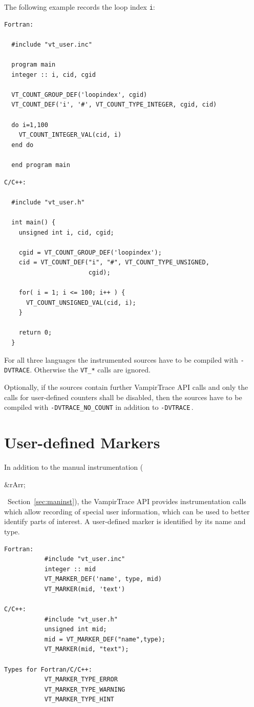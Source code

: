 \documentclass[a4paper,twoside,12pt,BCOR12mm]{scrbook}
\newcommand{\rarr}{$\Rightarrow$}  %
\renewcommand{\rarr}{\begin{rawhtml}&rArr;\end{rawhtml}}   %
\begin{document}
\noindent The following example records the loop index \texttt{i}:

\begin{verbatim}
Fortran:

  #include "vt_user.inc"

  program main
  integer :: i, cid, cgid

  VT_COUNT_GROUP_DEF('loopindex', cgid)
  VT_COUNT_DEF('i', '#', VT_COUNT_TYPE_INTEGER, cgid, cid)

  do i=1,100
    VT_COUNT_INTEGER_VAL(cid, i)
  end do

  end program main
\end{verbatim} 

\begin{verbatim}
C/C++:

  #include "vt_user.h"

  int main() {
    unsigned int i, cid, cgid;

    cgid = VT_COUNT_GROUP_DEF('loopindex');
    cid = VT_COUNT_DEF("i", "#", VT_COUNT_TYPE_UNSIGNED,
                       cgid);

    for( i = 1; i <= 100; i++ ) {
      VT_COUNT_UNSIGNED_VAL(cid, i);
    }

    return 0;
  }
\end{verbatim}

  \noindent For all three languages the instrumented sources have to be compiled 
  with \texttt{-DVTRACE}. Otherwise the \texttt{VT\_*} calls are ignored.

  Optionally, if the sources contain further VampirTrace API calls and only the
  calls for user-defined counters shall be disabled, then the sources have to be
  compiled with \texttt{-DVTRACE\_NO\_COUNT} in addition to \texttt{-DVTRACE}\,.

\section{User-defined Markers}
\label{userdefinedmarkers}

  In addition to the manual instrumentation (\rarr\ Section~\ref{sec:maninst}), the VampirTrace API
  provides instrumentation calls which allow recording of special user information, which 
  can be used to better identify parts of interest.
  A user-defined marker is identified by its name and type.

\begin{verbatim}
Fortran:
           #include "vt_user.inc"
           integer :: mid
           VT_MARKER_DEF('name', type, mid)
           VT_MARKER(mid, 'text')

C/C++:
           #include "vt_user.h"
           unsigned int mid;
           mid = VT_MARKER_DEF("name",type);
           VT_MARKER(mid, "text");

Types for Fortran/C/C++:
           VT_MARKER_TYPE_ERROR
           VT_MARKER_TYPE_WARNING
           VT_MARKER_TYPE_HINT
\end{verbatim}
\end{document}
